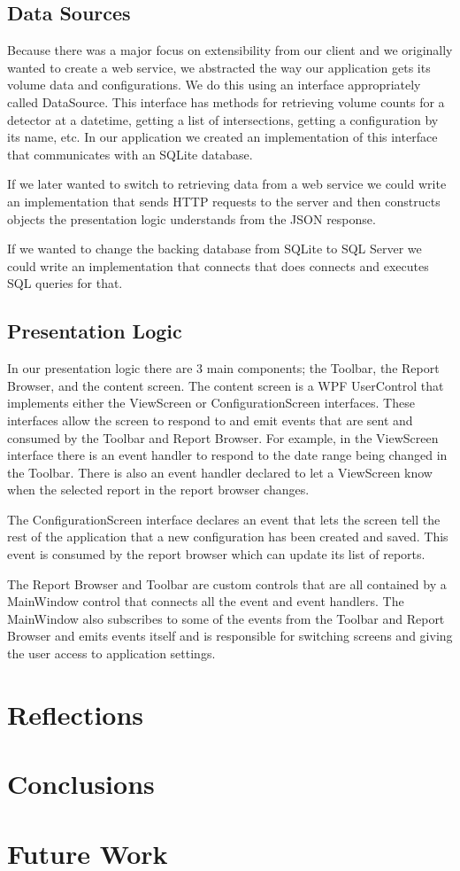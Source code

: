\documentclass{article}
\begin{document}
\subsection{Data Sources}
Because there was a major focus on extensibility from our client and we originally wanted to create a web service, we abstracted the way our application gets its volume data and configurations. We do this using an interface appropriately called DataSource. This interface has methods for retrieving volume counts for a detector at a datetime, getting a list of intersections, getting a configuration by its name, etc. In our application we created an implementation of this interface that communicates with an SQLite database.

If we later wanted to switch to retrieving data from a web service we could write an implementation that sends HTTP requests to the server and then constructs objects the presentation logic understands from the JSON response.

If we wanted to change the backing database from SQLite to SQL Server we could write an implementation that connects that does connects and executes SQL queries for that.

\subsection{Presentation Logic}
In our presentation logic there are 3 main components; the Toolbar, the Report Browser, and the content screen. The content screen  is a WPF UserControl that implements either the ViewScreen or ConfigurationScreen interfaces. These interfaces allow the screen to respond to and emit events that are sent and consumed by the Toolbar and Report Browser. For example, in the ViewScreen interface there is an event handler to respond to the date range being changed in the Toolbar. There is also an event handler declared to let a ViewScreen know when the selected report in the report browser changes.

The ConfigurationScreen interface declares an event that lets the screen tell the rest of the application that a new configuration has been created and saved. This event is consumed by the report browser which can update its list of reports.

The Report Browser and Toolbar are custom controls that are all contained by a MainWindow control that connects all the event and event handlers. The MainWindow also subscribes to some of the events from the Toolbar and Report Browser and emits events itself and is responsible for switching screens and giving the user access to application settings.

\section{Reflections}
\section{Conclusions}

\section{Future Work}



\end{document}
